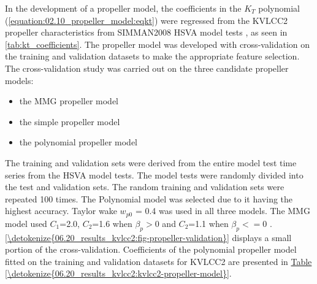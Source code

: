 In the development of a propeller model, the coefficients in the \(K_T\) polynomial (\autoref{equation:02.10_propeller_model:eqkt}) were regressed from the KVLCC2 propeller characteristics from SIMMAN2008 HSVA model tests \cite{stern_experience_2011}, as seen in \autoref{tab:kt_coefficients}. The propeller model was developed with cross-validation on the training and validation datasets to make the appropriate feature selection.
The cross-validation study was carried out on the three candidate propeller models: 
\vspace{5pt}
\begin{itemize}
    \setlength\itemsep{5pt}
    \item the MMG propeller model
    \item the simple propeller model
    \item the polynomial propeller model
\end{itemize}
\vspace{5pt}
The training and validation sets were derived from the entire model test time series from the HSVA model tests. The model tests were randomly divided into the test and validation sets. The random training and validation sets were repeated 100 times. The Polynomial model was selected due to it having the highest accuracy. Taylor wake \(w_{p0}\) = {0.4} was used in all three models. The MMG model used \(C_1\)={2.0}, \(C_2\)={1.6} when \(\beta_p>0\) and \(C_2\)={1.1} when \(\beta_p<=0\) \cite{yasukawa_introduction_2015}. \hyperref[\detokenize{06.20_results_kvlcc2:fig-propeller-validation}]{\autoref{\detokenize{06.20_results_kvlcc2:fig-propeller-validation}}} displays a small portion of the cross-validation. Coefficients of the polynomial propeller model fitted on the training and validation datasets for KVLCC2 are presented in \hyperref[\detokenize{06.20_results_kvlcc2:kvlcc2-propeller-model}]{Table \ref{\detokenize{06.20_results_kvlcc2:kvlcc2-propeller-model}}}.

